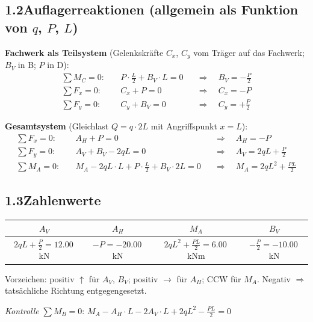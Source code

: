 \documentclass[a4paper,11pt]{article}
\begin{document}
\subsection*{1.2\quad Auflagerreaktionen (allgemein als Funktion von $q$, $P$, $L$)}

\textbf{Fachwerk als Teilsystem}
(Gelenkskräfte $C_x$, $C_y$ vom Träger auf das Fachwerk; $B_V$ in B; $P$ in D):
\begin{align*}
  \sum M_C = 0:\quad & P \cdot \tfrac{L}{2} + B_V \cdot L = 0
    &&\Rightarrow\quad \boxed{B_V = -\tfrac{P}{2}} \\
  \sum F_x = 0:\quad & C_x + P = 0
    &&\Rightarrow\quad C_x = -P \\
  \sum F_y = 0:\quad & C_y + B_V = 0
    &&\Rightarrow\quad C_y = +\tfrac{P}{2}
\end{align*}

\textbf{Gesamtsystem} (Gleichlast $Q = q \cdot 2L$ mit Angriffspunkt $x = L$):
\begin{align*}
  \sum F_x = 0:\quad & A_H + P = 0
    &&\Rightarrow\quad \boxed{A_H = -P} \\
  \sum F_y = 0:\quad & A_V + B_V - 2qL = 0
    &&\Rightarrow\quad \boxed{A_V = 2qL + \tfrac{P}{2}} \\
  \sum M_A = 0:\quad & M_A - 2qL \cdot L + P\cdot\tfrac{L}{2} + B_V \cdot 2L = 0
    &&\Rightarrow\quad \boxed{M_A = 2qL^2 + \tfrac{PL}{2}}
\end{align*}

\subsection*{1.3\quad Zahlenwerte}

\begin{center}
\begin{tabular}{cccc}
\toprule
$A_V$ & $A_H$ & $M_A$ & $B_V$ \\
\midrule
$2qL + \tfrac{P}{2} = \mathbf{12.00}$\,kN
& $-P = \mathbf{-20.00}$\,kN
& $2qL^2 + \tfrac{PL}{2} = \mathbf{6.00}$\,kNm
& $-\tfrac{P}{2} = \mathbf{-10.00}$\,kN \\
\bottomrule
\end{tabular}
\end{center}

Vorzeichen: positiv $\uparrow$ für $A_V$, $B_V$; positiv $\rightarrow$ für $A_H$;
CCW für $M_A$. Negativ $\Rightarrow$ tatsächliche Richtung entgegengesetzt.

\textit{Kontrolle} $\sum M_B = 0$:
$M_A - A_H \cdot L - 2A_V \cdot L + 2qL^2 - \tfrac{PL}{2} = 0$\;
\checkmark
\end{document}
